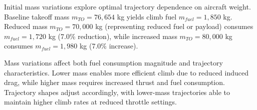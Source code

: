 Initial mass variations explore optimal trajectory dependence on aircraft weight. Baseline takeoff mass $m_{TO} = 76,654$ kg yields climb fuel $m_{fuel} = 1,850$ kg. Reduced mass $m_{TO} = 70,000$ kg (representing reduced fuel or payload) consumes $m_{fuel} = 1,720$ kg (7.0\% reduction), while increased mass $m_{TO} = 80,000$ kg consumes $m_{fuel} = 1,980$ kg (7.0\% increase).

Mass variations affect both fuel consumption magnitude and trajectory characteristics. Lower mass enables more efficient climb due to reduced induced drag, while higher mass requires increased thrust and fuel consumption. Trajectory shapes adjust accordingly, with lower-mass trajectories able to maintain higher climb rates at reduced throttle settings.